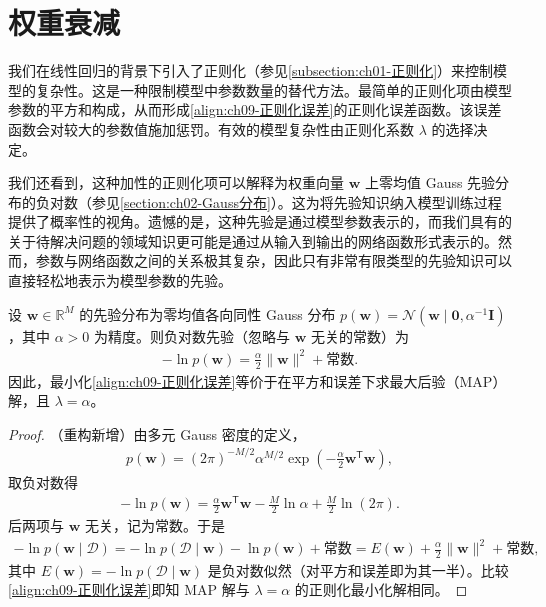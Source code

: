 \documentclass[../../main.tex]{subfiles}
\begin{document}
\section{权重衰减}\label{section:ch09-权重衰减}

我们在线性回归的背景下引入了正则化（参见\cref{subsection:ch01-正则化}）来控制模型的复杂性。这是一种限制模型中参数数量的替代方法。最简单的正则化项由模型参数的平方和构成，从而形成\eqref{align:ch09-正则化误差}的正则化误差函数。该误差函数会对较大的参数值施加惩罚。有效的模型复杂性由正则化系数 $\lambda$ 的选择决定。

我们还看到，这种加性的正则化项可以解释为权重向量 $\boldsymbol{w}$ 上零均值 Gauss 先验分布的负对数（参见\cref{section:ch02-Gauss分布}）。这为将先验知识纳入模型训练过程提供了概率性的视角。遗憾的是，这种先验是通过模型参数表示的，而我们具有的关于待解决问题的领域知识更可能是通过从输入到输出的网络函数形式表示的。然而，参数与网络函数之间的关系极其复杂，因此只有非常有限类型的先验知识可以直接轻松地表示为模型参数的先验。

\begin{proposition}\label{proposition:ch09-Gauss先验}
设 $\boldsymbol{w}\in\mathbb{R}^{M}$ 的先验分布为零均值各向同性 Gauss 分布 $p(\boldsymbol{w})=\mathcal{N}(\boldsymbol{w}\mid\boldsymbol{0},\alpha^{-1}\boldsymbol{I})$，其中 $\alpha>0$ 为精度。则负对数先验（忽略与 $\boldsymbol{w}$ 无关的常数）为
\begin{align*}
-\ln p(\boldsymbol{w})=\frac{\alpha}{2}\|\boldsymbol{w}\|^{2}+\text{常数}.
\end{align*}
因此，最小化\eqref{align:ch09-正则化误差}等价于在平方和误差下求最大后验（MAP）解，且 $\lambda=\alpha$。
\end{proposition}

\begin{proof}
（重构新增）由多元 Gauss 密度的定义，
\begin{align*}
p(\boldsymbol{w})=(2\pi)^{-M/2}\alpha^{M/2}\exp\!\left(-\frac{\alpha}{2}\boldsymbol{w}^{\mathsf T}\boldsymbol{w}\right),
\end{align*}
取负对数得
\begin{align*}
-\ln p(\boldsymbol{w})=\frac{\alpha}{2}\boldsymbol{w}^{\mathsf T}\boldsymbol{w}-\frac{M}{2}\ln\alpha+\frac{M}{2}\ln(2\pi).
\end{align*}
后两项与 $\boldsymbol{w}$ 无关，记为常数。于是
\begin{align*}
-\ln p(\boldsymbol{w}\mid\mathcal{D})=-\ln p(\mathcal{D}\mid\boldsymbol{w})-\ln p(\boldsymbol{w})+\text{常数}=E(\boldsymbol{w})+\frac{\alpha}{2}\|\boldsymbol{w}\|^{2}+\text{常数},
\end{align*}
其中 $E(\boldsymbol{w})=-\ln p(\mathcal{D}\mid\boldsymbol{w})$ 是负对数似然（对平方和误差即为其一半）。比较\eqref{align:ch09-正则化误差}即知 MAP 解与 $\lambda=\alpha$ 的正则化最小化解相同。
\end{proof}
\end{document}
